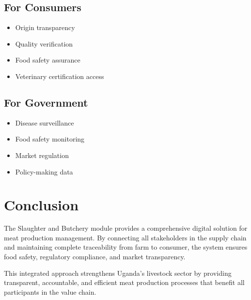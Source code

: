 \documentclass[11pt,a4paper]{article}
\begin{document}
\subsection{For Consumers}
\begin{itemize}[leftmargin=*]
    \item Origin transparency
    \item Quality verification
    \item Food safety assurance
    \item Veterinary certification access
\end{itemize}

\subsection{For Government}
\begin{itemize}[leftmargin=*]
    \item Disease surveillance
    \item Food safety monitoring
    \item Market regulation
    \item Policy-making data
\end{itemize}

\section{Conclusion}

The Slaughter and Butchery module provides a comprehensive digital solution for meat production management. By connecting all stakeholders in the supply chain and maintaining complete traceability from farm to consumer, the system ensures food safety, regulatory compliance, and market transparency.

This integrated approach strengthens Uganda's livestock sector by providing transparent, accountable, and efficient meat production processes that benefit all participants in the value chain.
\end{document}

